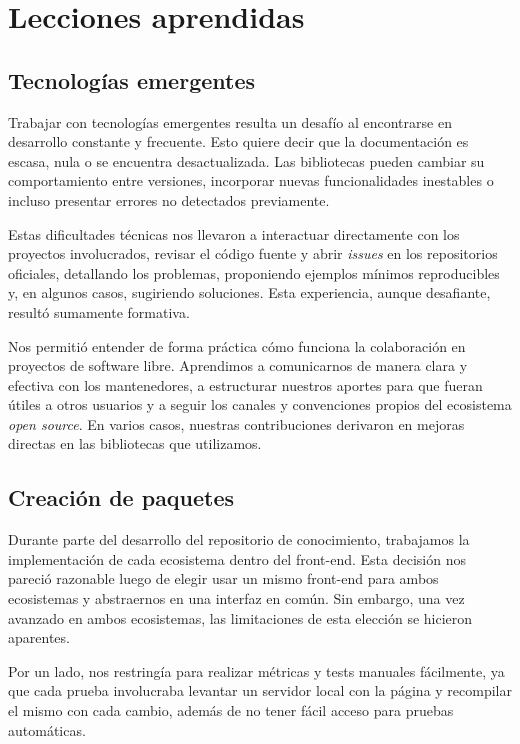\section{Lecciones aprendidas}

\subsection{Tecnologías emergentes}

Trabajar con tecnologías emergentes resulta un desafío al encontrarse en desarrollo constante y frecuente. Esto quiere decir que la documentación es escasa, nula o se encuentra desactualizada. Las bibliotecas pueden cambiar su comportamiento entre versiones, incorporar nuevas funcionalidades inestables o incluso presentar errores no detectados previamente.

Estas dificultades técnicas nos llevaron a interactuar directamente con los proyectos involucrados, revisar el código fuente y abrir \textit{issues} en los repositorios oficiales, detallando los problemas, proponiendo ejemplos mínimos reproducibles y, en algunos casos, sugiriendo soluciones. Esta experiencia, aunque desafiante, resultó sumamente formativa.

Nos permitió entender de forma práctica cómo funciona la colaboración en proyectos de software libre. Aprendimos a comunicarnos de manera clara y efectiva con los mantenedores, a estructurar nuestros aportes para que fueran útiles a otros usuarios y a seguir los canales y convenciones propios del ecosistema \textit{open source}. En varios casos, nuestras contribuciones derivaron en mejoras directas en las bibliotecas que utilizamos.

\subsection{Creación de paquetes}
Durante parte del desarrollo del repositorio de conocimiento, trabajamos la implementación de cada ecosistema dentro del front-end. Esta decisión nos pareció razonable luego de elegir usar un mismo front-end para ambos ecosistemas y abstraernos en una interfaz en común. Sin embargo, una vez avanzado en ambos ecosistemas, las limitaciones de esta elección se hicieron aparentes.

Por un lado, nos restringía para realizar métricas y tests manuales fácilmente, ya que cada prueba involucraba levantar un servidor local con la página y recompilar el mismo con cada cambio, además de no tener fácil acceso para pruebas automáticas.

